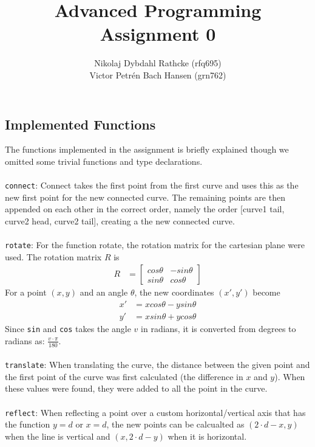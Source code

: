 \documentclass[a4paper]{article}
\author{Nikolaj Dybdahl Rathcke (rfq695) \\ Victor Petrén Bach Hansen (grn762)}
\title{Advanced Programming \\ Assignment 0}
\begin{document}
\maketitle

\subsection*{Implemented Functions}
The functions implemented in the assignment is briefly explained though we omitted some trivial functions and type declarations. \\
\\
\texttt{connect}: Connect takes the first point from the first curve and uses this as the new first point for the new connected curve. The remaining points are then appended on each other in the correct order, namely the order [curve1 tail, curve2 head, curve2 tail], creating a the new connected curve. \\
\\
\texttt{rotate}:
For the function rotate, the rotation matrix for the cartesian plane were used. The rotation matrix $R$ is
\begin{align*}
R&=
\begin{bmatrix}
cos\theta & -sin\theta \\
sin\theta & cos\theta
\end{bmatrix}
\end{align*}
For a point $(x,y)$ and an angle $\theta$, the new coordinates $(x', y')$ become
\begin{align*}
x'&=xcos\theta-ysin\theta \\
y'&=xsin\theta+ycos\theta
\end{align*}
Since \texttt{sin} and \texttt{cos} takes the angle $v$ in radians, it is converted from degrees to radians as: $\frac{v\cdot \pi}{180}$. \\
\\
\texttt{translate}:
When translating the curve, the distance between the given point and the first point of the curve was first calculated (the difference in $x$ and $y$). When these values were found, they were added to all the point in the curve. \\
\\
\texttt{reflect}:
When reflecting a point over a custom horizontal/vertical axis that has the function $y=d$ or $x=d$, the new points can be calcualted as $(2\cdot d-x, y)$ when the line is vertical and $(x, 2\cdot d-y)$ when it is horizontal. \\
\\
\end{document}
